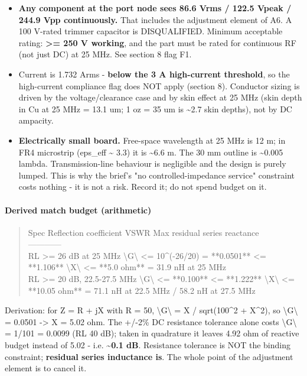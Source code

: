 \documentclass[11pt,a4paper]{article}
\begin{document}
\begin{itemize}
\item \textbf{Any component at the port node sees 86.6 Vrms / 122.5 Vpeak / 244.9 Vpp continuously.}
That includes the adjustment element of A6. A 100 V-rated trimmer capacitor is DISQUALIFIED.
Minimum acceptable rating: \textbf{\textgreater{}= 250 V working}, and the part must be rated for continuous RF
(not just DC) at 25 MHz. See section 8 flag F1.
\item Current is 1.732 Arms - \textbf{below the 3 A high-current threshold}, so the high-current
compliance flag does NOT apply (section 8). Conductor sizing is driven by the voltage/clearance
case and by skin effect at 25 MHz (skin depth in Cu at 25 MHz = 13.1 um; 1 oz = 35 um is
\textasciitilde{}2.7 skin depths), not by DC ampacity.
\item \textbf{Electrically small board.} Free-space wavelength at 25 MHz is 12 m; in FR4 microstrip
(eps\_eff \textasciitilde{} 3.3) it is \textasciitilde{}6.6 m. The 30 mm outline is \textasciitilde{}0.005 lambda. Transmission-line behaviour is
negligible and the design is purely lumped. This is why the brief's "no controlled-impedance
service" constraint costs nothing - it is not a risk. Record it; do not spend budget on it.
\end{itemize}
\paragraph*{Derived match budget (arithmetic)}
\begin{quote}\small\ttfamily\raggedright
\textbar{} Spec \textbar{} Reflection coefficient \textbar{} VSWR \textbar{} Max residual series reactance \textbar{}\\
\textbar{}---\textbar{}---\textbar{}---\textbar{}---\textbar{}\\
\textbar{} RL \textgreater{}= 26 dB at 25 MHz \textbar{} \textbackslash{}\textbar{}G\textbackslash{}\textbar{} \textless{}= 10\textasciicircum{}(-26/20) = {*}{*}0.0501{*}{*} \textbar{} \textless{}= {*}{*}1.106{*}{*} \textbar{} \textbackslash{}\textbar{}X\textbackslash{}\textbar{} \textless{}= {*}{*}5.0 ohm{*}{*} = 31.9 nH at 25 MHz \textbar{}\\
\textbar{} RL \textgreater{}= 20 dB, 22.5-27.5 MHz \textbar{} \textbackslash{}\textbar{}G\textbackslash{}\textbar{} \textless{}= {*}{*}0.100{*}{*} \textbar{} \textless{}= {*}{*}1.222{*}{*} \textbar{} \textbackslash{}\textbar{}X\textbackslash{}\textbar{} \textless{}= {*}{*}10.05 ohm{*}{*} = 71.1 nH at 22.5 MHz / 58.2 nH at 27.5 MHz \textbar{}
\end{quote}
Derivation: for Z = R + jX with R = 50, \textbackslash{}\textbar{}G\textbackslash{}\textbar{} = X / sqrt(100\textasciicircum{}2 + X\textasciicircum{}2), so \textbackslash{}\textbar{}G\textbackslash{}\textbar{} = 0.0501 -\textgreater{} X = 5.02 ohm. The +/-2\% DC resistance tolerance alone costs \textbackslash{}\textbar{}G\textbackslash{}\textbar{} = 1/101 = 0.0099 (RL 40 dB); taken in quadrature it leaves 4.92 ohm of reactive budget instead of 5.02 - i.e. \textbf{\textasciitilde{}0.1 dB}. Resistance tolerance is NOT the binding constraint; \textbf{residual series inductance is}. The whole point of the adjustment element is to cancel it.
\end{document}
